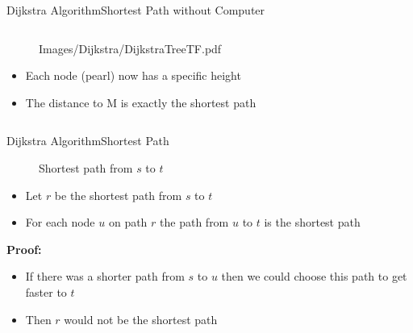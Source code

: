 \begin{frame}{Dijkstra Algorithm}{Shortest Path without Computer}
\begin{columns}
\begin{column}{0.5\linewidth}
\begin{figure}[!t]
          {Images/Dijkstra/DijkstraTreeTF.pdf}
        \vspace{-0.5em}
      \end{figure}
      \begin{itemize}
        \item
          Each node (pearl) now has a specific height
        \item
          The distance to M is exactly the {\color{MainA}shortest path}
        \end{itemize}
    \end{column}
  \end{columns}
\end{frame}


\begin{frame}{Dijkstra Algorithm}{Shortest Path}
  \vspace{-1.5em}
  \begin{figure}
    \begin{adjustbox}{width=0.75\linewidth}
      
    \end{adjustbox}
    \label{fig:dijkstra:shortest_path_introduction}
    \caption{Shortest path from {\color{MainA}$s$} to
    {\color{MainA}$t$}}
  \end{figure}
  \vspace{-1.5em}
  \begin{itemize}
    \item
      Let {\color{MainB}$r$} be the shortest path from
      {\color{MainA}$s$} to {\color{MainA}$t$}
    \item
      For each node {\color{MainA}$u$} on path {\color{MainB}$r$}
      the path from {\color{MainA}$u$} to {\color{MainA}$t$} is
      the shortest path
  \end{itemize}
  \textbf{Proof:}
  \begin{itemize}
    \item
      If there was a shorter path from {\color{MainA}$s$} to
      {\color{MainA}$u$} then we could choose this path to get faster to
      {\color{MainA}$t$}
    \item
      Then {\color{MainB}$r$} would not be the shortest path
  \end{itemize}
\end{frame}


